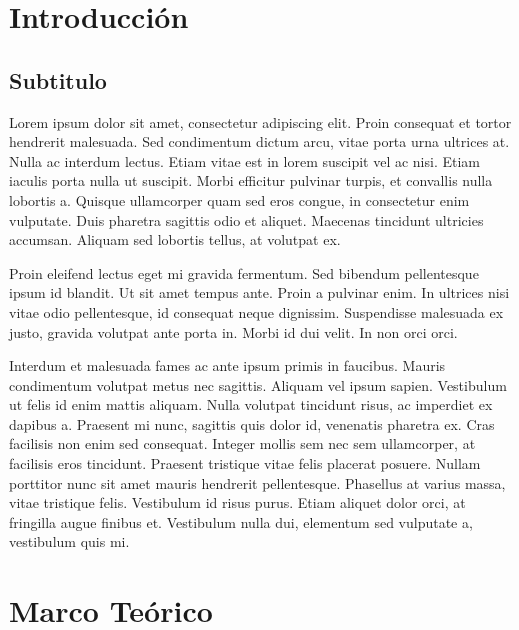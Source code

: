 \documentclass[a4paper, 11pt]{article}
\begin{document}
\tableofcontents
\newpage

\section{Introducción}\label{Introd}
\subsection{Subtitulo}
Lorem ipsum dolor sit amet, consectetur adipiscing elit. Proin consequat et tortor hendrerit malesuada. Sed condimentum dictum arcu, vitae porta urna ultrices at. Nulla ac interdum lectus. Etiam vitae est in lorem suscipit vel ac nisi. Etiam iaculis porta nulla ut suscipit. Morbi efficitur pulvinar turpis, et convallis nulla lobortis a. Quisque ullamcorper quam sed eros congue, in consectetur enim vulputate. Duis pharetra sagittis odio et aliquet. Maecenas tincidunt ultricies accumsan. Aliquam sed lobortis tellus, at volutpat ex.

Proin eleifend lectus eget mi gravida fermentum. Sed bibendum pellentesque ipsum id blandit. Ut sit amet tempus ante. Proin a pulvinar enim. In ultrices nisi vitae odio pellentesque, id consequat neque dignissim. Suspendisse malesuada ex justo, gravida volutpat ante porta in. Morbi id dui velit. In non orci orci.

Interdum et malesuada fames ac ante ipsum primis in faucibus. Mauris condimentum volutpat metus nec sagittis. Aliquam vel ipsum sapien. Vestibulum ut felis id enim mattis aliquam. Nulla volutpat tincidunt risus, ac imperdiet ex dapibus a. Praesent mi nunc, sagittis quis dolor id, venenatis pharetra ex. Cras facilisis non enim sed consequat. Integer mollis sem nec sem ullamcorper, at facilisis eros tincidunt. Praesent tristique vitae felis placerat posuere. Nullam porttitor nunc sit amet mauris hendrerit pellentesque. Phasellus at varius massa, vitae tristique felis. Vestibulum id risus purus. Etiam aliquet dolor orci, at fringilla augue finibus et. Vestibulum nulla dui, elementum sed vulputate a, vestibulum quis mi.

\section{Marco Teórico}\label{MarcoTeorico}
\end{document}
